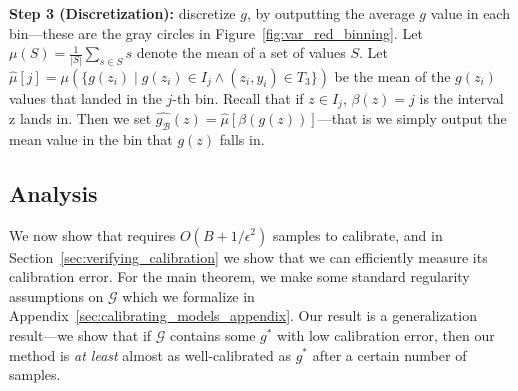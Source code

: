\textbf{Step 3 (Discretization):}  discretize $g$, by outputting the average $g$ value in each bin---these are the gray circles in Figure~\ref{fig:var_red_binning}. Let $\mu(S) = \frac{1}{|S|} \sum_{s \in S} s$ denote the mean of a set of values $S$.
Let $\hat{\mu}[j] = \mu(\{ g(z_i) \; | \; g(z_i) \in I_j \wedge (z_i, y_i) \in T_3 \})$ be the mean of the $g(z_i)$ values that landed in the $j$-th bin.
Recall that if $z \in I_j$,  $\beta(z) = j$ is the interval z lands in.
Then we set $\hat{g_{\mathcal{B}}}(z) = \hat{\mu}[\beta(g(z))]$---that is we simply output the mean value in the bin that $g(z)$ falls in.




\subsection{Analysis}

We now show that \ourcal{} requires $O(B + 1/\epsilon^2)$ samples to calibrate, and in Section~\ref{sec:verifying_calibration} we show that we can efficiently measure its calibration error. For the main theorem, we make some standard regularity assumptions on $\mathcal{G}$ which we formalize in Appendix~\ref{sec:calibrating_models_appendix}. Our result is a generalization result---we show that if $\mathcal{G}$ contains some $g^*$ with low calibration error, then our method is \emph{at least} almost as well-calibrated as $g^*$  after a certain number of samples.

\newcommand{\finalCalibText}{
Assume regularity conditions on $\mathcal{G}$ (finite parameters, injectivity, Lipschitz-continuity, consistency, twice differentiability). Given $\delta \in (0, 1)$, there is a constant $c$ such that \emph{for all} $B, \epsilon > 0$, with $n \geq c \Big(B\log{B} + \frac{\log{B}}{\epsilon^2}\Big)$ samples, \ourcal{} finds $\hat{g}_{\mathcal{B}}$ with $\squaredce(\hat{g}_{\mathcal{B}}) \leq 2\min_{g \in \mathcal{G}}\squaredce(g) + \epsilon^2$, with probability $\geq 1 - \delta$.
}

